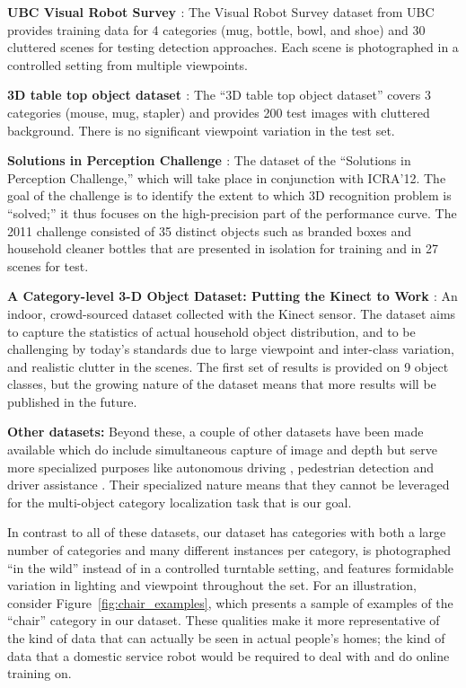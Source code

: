 {\bf UBC Visual Robot Survey \cite{Helmer2010}}:
The Visual Robot Survey dataset from UBC provides training data for 4 categories (mug, bottle, bowl, and shoe) and 30 cluttered scenes for testing detection approaches.
Each scene is photographed in a controlled setting from multiple viewpoints.

{\bf 3D table top object dataset \cite{Sun2010}}:
The ``3D table top object dataset'' covers 3 categories (mouse, mug, stapler) and provides 200 test images with cluttered background.
There is no significant viewpoint variation in the test set.

{\bf Solutions in Perception Challenge \cite{SIPC2011}}:
The dataset of the ``Solutions in Perception Challenge,'' which will take place in conjunction with ICRA'12.
The goal of the challenge is to identify the extent to which 3D recognition problem is ``solved;'' it thus focuses on the high-precision part of the performance curve.
The 2011 challenge consisted of 35 distinct objects such as branded boxes and household cleaner bottles that are presented in isolation for training and in 27 scenes for test.

{\bf A Category-level 3-D Object Dataset: Putting the Kinect to Work \cite{Janoch2011}}:
An indoor, crowd-sourced dataset collected with the Kinect sensor.
The dataset aims to capture the statistics of actual household object distribution, and to be challenging by today's standards due to large viewpoint and inter-class variation, and realistic clutter in the scenes.
The first set of results is provided on 9 object classes, but the growing nature of the dataset means that more results will be published in the future.

{\bf Other datasets:} Beyond these, a couple of other datasets have been made available which do include simultaneous capture of image and depth but serve more specialized purposes like autonomous driving \cite{ford_dataset}, pedestrian detection \cite{leibe10ijrr} and driver assistance \cite{walk10eccv}.
Their specialized nature means that they cannot be leveraged for the multi-object category localization task that is our goal.

In contrast to all of these datasets, our dataset has categories with both a large number of categories and many different instances per category, is photographed ``in the wild'' instead of in a controlled turntable setting, and features formidable variation in lighting and viewpoint throughout the set.
For an illustration, consider Figure~\ref{fig:chair_examples}, which presents a sample of examples of the ``chair'' category in our dataset.
These qualities make it more representative of the kind of data that can actually be seen in actual people's homes; the kind of data that a domestic service robot would be required to deal with and do online training on.

